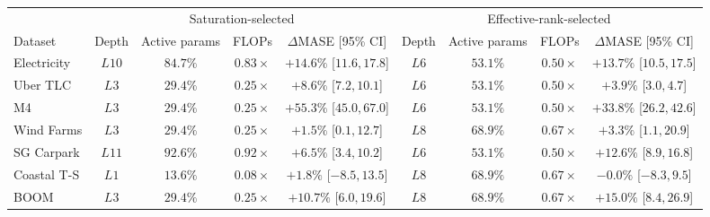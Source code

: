 \begin{tabular}{lcccccccc}
    \toprule
    & \multicolumn{4}{c}{Saturation-selected} &
      \multicolumn{4}{c}{Effective-rank-selected} \\
    \cmidrule(lr){2-5}
    \cmidrule(lr){6-9}
    Dataset &
    Depth & Active params & FLOPs & $\Delta$MASE [95\% CI] &
    Depth & Active params & FLOPs & $\Delta$MASE [95\% CI] \\
    \midrule
    Electricity & \(L10\) & \(84.7\%\) & \(0.83\times\) & \(+14.6\%\) [\(11.6,17.8\)] & \(L6\) & \(53.1\%\) & \(0.50\times\) & \(+13.7\%\) [\(10.5,17.5\)] \\
    Uber TLC & \(L3\) & \(29.4\%\) & \(0.25\times\) & \(+8.6\%\) [\(7.2,10.1\)] & \(L6\) & \(53.1\%\) & \(0.50\times\) & \(+3.9\%\) [\(3.0,4.7\)] \\
    M4 & \(L3\) & \(29.4\%\) & \(0.25\times\) & \(+55.3\%\) [\(45.0,67.0\)] & \(L6\) & \(53.1\%\) & \(0.50\times\) & \(+33.8\%\) [\(26.2,42.6\)] \\
    Wind Farms & \(L3\) & \(29.4\%\) & \(0.25\times\) & \(+1.5\%\) [\(0.1,12.7\)] & \(L8\) & \(68.9\%\) & \(0.67\times\) & \(+3.3\%\) [\(1.1,20.9\)] \\
    \midrule
    SG Carpark & \(L11\) & \(92.6\%\) & \(0.92\times\) & \(+6.5\%\) [\(3.4,10.2\)] & \(L6\) & \(53.1\%\) & \(0.50\times\) & \(+12.6\%\) [\(8.9,16.8\)] \\
    Coastal T-S & \(L1\) & \(13.6\%\) & \(0.08\times\) & \(+1.8\%\) [\(-8.5,13.5\)] & \(L8\) & \(68.9\%\) & \(0.67\times\) & \(-0.0\%\) [\(-8.3,9.5\)] \\
    BOOM & \(L3\) & \(29.4\%\) & \(0.25\times\) & \(+10.7\%\) [\(6.0,19.6\)] & \(L8\) & \(68.9\%\) & \(0.67\times\) & \(+15.0\%\) [\(8.4,26.9\)] \\
    \bottomrule
\end{tabular}
